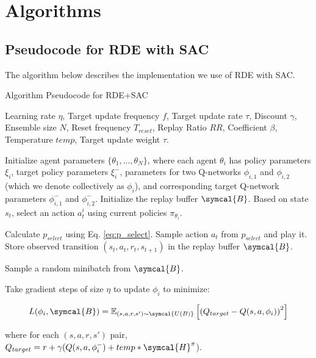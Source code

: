 \documentclass[base]{subfiles}
\begin{document}
\section{Algorithms} \label{app:a}

\subsection{Pseudocode for RDE with SAC}

The algorithm below describes the implementation we use of RDE with SAC.

\begin{algorithm}
\caption{Algorithm Pseudocode for RDE+SAC}
\label{alg:rde_sac}
\begin{algorithmic}[1]
\Require Learning rate $\eta$, Target update frequency $f$, Target update rate $\tau$, Discount $\gamma$, Ensemble size $N$, Reset frequency $T_{reset}$, Replay Ratio $RR$, Coefficient $\beta$, Temperature $temp$, Target update weight $\tau$.

\State Initialize agent parameters $\{ \theta_1, ..., \theta_N \}$, where each agent $\theta_i$ has policy parameters $\xi_i$, target policy parameters $\xi_i^{-}$, parameters for two Q-networks $\phi_{i,1}$ and $\phi_{i,2}$ (which we denote collectively as $\phi_i$), and corresponding target Q-network parameters $\phi_{i,1}^{-}$ and $\phi_{i,2}^{-}$.
\State Initialize the replay buffer $\symcal{B}$.
\State Based on state $s_t$, select an action $a_t^i$ using current policies $\pi_{\theta_i}$.
\EndFor

\State Calculate $p_{select}$ using Eq. \ref{eq:p_select}.
\State Sample action $a_t$ from $p_{select}$ and play it.
\State Store observed transition $(s_t, a_t, r_t, s_{t+1})$ in the replay buffer $\symcal{B}$.

\State Sample a random minibatch from $\symcal{B}$.


\State Take gradient steps of size $\eta$ to update $\phi_i$ to minimize:

\begin{equation}
\notag
    L(\phi_i, \symcal{B}) = \mathbb{E}_{(s, a, r, s') \sim \symcal{U(B)}} \left[ \left( Q_{target} - Q(s, a, \phi_i)  \right)^2 \right]
\end{equation}

where for each $(s,a,r,s')$ pair, $Q_{target} = r + \gamma (Q(s,a,\phi_i^{-}) + temp*\symcal{H}^{\pi}$).


\end{algorithmic}
\end{algorithm}
\end{document}
